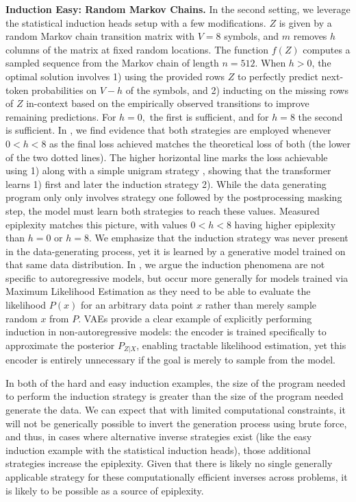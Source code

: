 \documentclass[twoside]{article}
\begin{document}
\textbf{Induction Easy: Random Markov Chains.} In the second setting, we leverage the statistical induction heads setup \citep{edelman2024evolution} with a few modifications. %
$Z$ is given by a random Markov chain transition matrix with $V=8$ symbols, and %
$m$ removes $h$ columns of the matrix at fixed random locations. The function $f(Z)$ computes a sampled sequence from the Markov chain of length $n=512$. When $h > 0$, the optimal solution involves 1) using the provided rows $Z$ to perfectly predict next-token probabilities on $V-h$ of the symbols, and 2) inducting on the missing rows of $Z$ in-context based on the empirically observed transitions to improve remaining predictions. For $h=0,$ the first is sufficient, and for $h=8$ the second is sufficient. In , we find evidence that both strategies are employed whenever $0<h<8$ as the final loss achieved matches the theoretical loss of both (the lower of the two dotted lines). The higher horizontal line marks the loss achievable using 1) along with a simple unigram strategy \citep{edelman2024evolution}, showing that the transformer learns 1) first and later the induction strategy 2). While the data generating program only only involves strategy one followed by the postprocessing masking step, the model must learn both strategies to reach these values.
%
Measured epiplexity matches this picture, with values $0<h<8$ having higher epiplexity than $h=0$ or $h=8$.  We emphasize that the induction strategy was never present in the data-generating process, yet it is learned by a generative model trained on that same data distribution. In , we argue the induction phenomena are not specific to autoregressive models, but occur more generally for models trained via Maximum Likelihood Estimation as they need to be able to evaluate the likelihood $P(x)$ for an arbitrary data point $x$ rather than merely sample random $x$ from $P.$ VAEs \citep{kingma2013auto} provide a clear example of explicitly performing induction in non-autoregressive models: the encoder is trained specifically to approximate the posterior $P_{Z|X}$, enabling tractable likelihood estimation, yet this encoder is entirely unnecessary if the goal is merely to sample from the model.

%
%

In both of the hard and easy induction examples, the size of the program needed to perform the induction strategy is greater than the size of the program needed generate the data. We can expect that with limited computational constraints, it will not be generically possible to invert the generation process using brute force, and thus, in cases where alternative inverse strategies exist (like the easy induction example with the statistical induction heads), those additional strategies increase the epiplexity. Given that there is likely no single generally applicable strategy for these computationally efficient inverses across problems, it is likely to be possible as a source of epiplexity.
\end{document}
